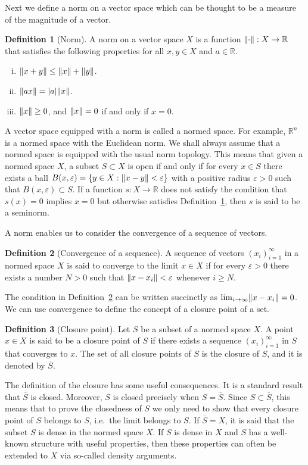 \documentclass[english, 12pt, a4paper, sci, utf8, a-2b, online]{aaltothesis}
\theoremstyle{definition}
\newtheorem{definition}{Definition}[section]
\theoremstyle{plain}
\DeclarePairedDelimiter\abs{\lvert}{\rvert}
\DeclarePairedDelimiter\norm{\lVert}{\rVert}
\numberwithin{equation}{section}
\begin{document}
Next we define a norm on a vector space which can be thought to be a measure
of the magnitude of a vector.
\begin{definition}[Norm]
    \label{def:norm}
    A norm on a vector space $X$ is a function $\norm{\cdot}: X \to \mathbb{R}$
    that satisfies the following properties for all $x,y \in X$
    and $a \in \mathbb{R}$.
    \begin{enumerate}[(i)]
        \item $\norm{x+y} \leq \norm{x} + \norm{y}$.
        \item $\norm{ax} = \abs{a} \norm{x}$.
        \item $\norm{x} \geq 0$, and $\norm{x}=0$ if and only if $x=0$.
    \end{enumerate}
\end{definition}
A vector space equipped with a norm is called a normed space.
For example, $\mathbb{R}^n$ is a normed space with the Euclidean norm.
We shall always assume that a normed space is equipped with the usual
norm topology. This means that given a normed space $X$, a subset $S \subset X$
is open if and only if for every $x \in S$ there exists a ball
$B(x,\varepsilon) = \{ y \in X : \norm{x-y} < \varepsilon \}$ with a positive
radius $\varepsilon > 0$ such that $B(x,\varepsilon) \subset S$.
If a function $s: X \to \mathbb{R}$ does not satisfy the condition
that $s(x) = 0$ implies $x = 0$ but otherwise satisfies Definition~\ref{def:norm},
then $s$ is said to be a seminorm.

A norm enables us to consider the convergence of a sequence of vectors.
\begin{definition}[Convergence of a sequence]
    \label{def:convergence}
    A sequence of vectors $(x_i)_{i=1}^{\infty}$ in a normed space $X$
    is said to converge to the limit $x \in X$ if for every $\varepsilon > 0$ 
    there exists a number $N > 0$
    such that $\norm{x-x_i} < \varepsilon$ whenever $i \geq N$.
\end{definition}
The condition in Definition~\ref{def:convergence} can be written succinctly
as $\lim_{i \to \infty} \norm{x-x_i} = 0$.
We can use convergence to define the concept of a closure point of a set.
\begin{definition}[Closure point]
    \label{def:closure_point}
    Let $S$ be a subset of a normed space $X$.
    A point $x \in X$ is said to be a closure point of $S$
    if there exists a sequence $(x_i)_{i=1}^{\infty}$ in $S$
    that converges to $x$.
    The set of all closure points of $S$ is the closure of $S$,
    and it is denoted by $\overline{S}$.
\end{definition}
The definition of the closure has some useful consequences.
It is a standard result that $\overline{S}$ is closed.
Moreover, $S$ is closed precisely when $S = \overline{S}$.
Since $S \subset \overline{S}$,
this means that to prove the closedness of $S$ we only need to show that
every closure point of $S$ belongs to $S$, i.e.\ the limit belongs to $S$.
If $\overline{S} = X$, it is said that the subset $S$ is dense in the
normed space $X$. If $S$ is dense in $X$ and $S$ has a well-known structure
with useful properties, then these properties can often be extended to $X$
via so-called density arguments.
\end{document}
